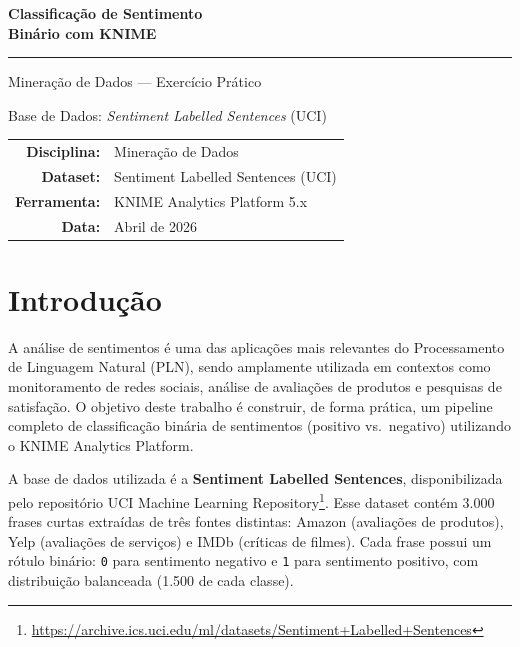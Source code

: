 \documentclass[12pt,a4paper]{article}
\begin{document}
\begin{titlepage}
\centering
\vspace*{3cm}

{\Huge\bfseries\color{azulescuro} Classificação de Sentimento\\[0.3cm] Binário com KNIME\par}

\vspace{0.5cm}
{\color{azulmedio}\rule{8cm}{2pt}}

\vspace{1cm}
{\Large\color{cinza} Mineração de Dados --- Exercício Prático\par}

\vspace{1.5cm}
{\large Base de Dados: \textit{Sentiment Labelled Sentences} (UCI)\par}

\vspace{4cm}

\begin{tabular}{rl}
\textbf{Disciplina:} & Mineração de Dados \\[6pt]
\textbf{Dataset:} & Sentiment Labelled Sentences (UCI) \\[6pt]
\textbf{Ferramenta:} & KNIME Analytics Platform 5.x \\[6pt]
\textbf{Data:} & Abril de 2026 \\
\end{tabular}

\vfill
\end{titlepage}

\tableofcontents
\newpage

\section{Introdução}

A análise de sentimentos é uma das aplicações mais relevantes do Processamento de Linguagem Natural (PLN), sendo amplamente utilizada em contextos como monitoramento de redes sociais, análise de avaliações de produtos e pesquisas de satisfação. O objetivo deste trabalho é construir, de forma prática, um pipeline completo de classificação binária de sentimentos (positivo vs.\ negativo) utilizando o KNIME Analytics Platform.

A base de dados utilizada é a \textbf{Sentiment Labelled Sentences}, disponibilizada pelo repositório UCI Machine Learning Repository\footnote{\url{https://archive.ics.uci.edu/ml/datasets/Sentiment+Labelled+Sentences}}. Esse dataset contém 3.000 frases curtas extraídas de três fontes distintas: Amazon (avaliações de produtos), Yelp (avaliações de serviços) e IMDb (críticas de filmes). Cada frase possui um rótulo binário: \texttt{0} para sentimento negativo e \texttt{1} para sentimento positivo, com distribuição balanceada (1.500 de cada classe).
\end{document}
